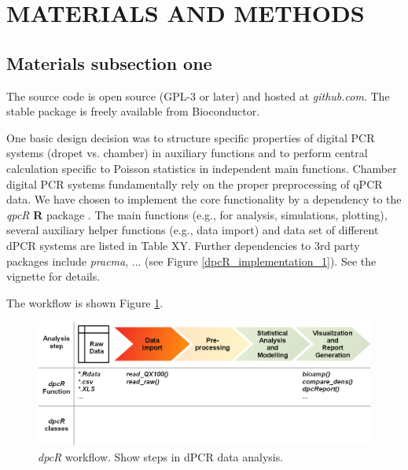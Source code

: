 \documentclass[a4,center,fleqn]{NAR}
\begin{document}
\enlargethispage{-65.1pt}


\section{MATERIALS AND METHODS}

\subsection{Materials subsection one}

The source code is open source (GPL-3 or later) and hosted at \textit{github.com}. The stable package is freely 
available from Bioconductor.

One basic design decision was to structure specific properties of digital PCR 
systems (dropet vs. chamber) in auxiliary functions and to perform central 
calculation specific to Poisson statistics in independent main functions. 
Chamber digital PCR systems fundamentally rely on the proper preprocessing of 
qPCR data. We have chosen to implement the core functionality by a dependency to 
the \textit{qpcR} \textbf{R} package \cite{ritz_qpcr_2008}. The main functions (e.g., for analysis, 
simulations, plotting), several auxiliary helper functions (e.g., data import) 
and data set of different dPCR systems are listed in Table XY. Further 
dependencies to 3rd party packages include \textit{pracma}, ... (see Figure \ref{dpcR_implementation_1}). See the vignette for 
details.

The workflow is shown Figure \ref{workflow}.

\begin{figure}[t]
\begin{center}
\includegraphics[width=17cm]{workflow.png}
\end{center}
\caption{\textit{dpcR} workflow. Show steps in dPCR data analysis.} 
\label{workflow}
\end{figure}
\end{document}
